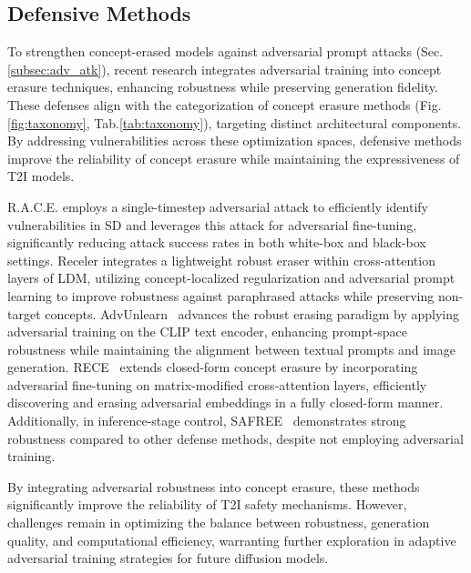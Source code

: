 \subsection{Defensive Methods}
To strengthen concept-erased models against adversarial prompt attacks (Sec.\ref{subsec:adv_atk}), recent research integrates adversarial training into concept erasure techniques, enhancing robustness while preserving generation fidelity. These defenses align with the categorization of concept erasure methods (Fig.\ref{fig:taxonomy}, Tab.\ref{tab:taxonomy}), targeting distinct architectural components. 
By addressing vulnerabilities across these optimization spaces, defensive methods improve the reliability of concept erasure while maintaining the expressiveness of T2I models.


R.A.C.E.\cite{RACE} employs a single-timestep adversarial attack to efficiently identify vulnerabilities in SD and leverages this attack for adversarial fine-tuning, significantly reducing attack success rates in both white-box and black-box settings. Receler\cite{Huang2023RecelerRC} integrates a lightweight robust eraser within cross-attention layers of LDM, utilizing concept-localized regularization and adversarial prompt learning to improve robustness against paraphrased attacks while preserving non-target concepts. AdvUnlearn~\cite{Zhang2024DefensiveUW} advances the robust erasing paradigm by applying adversarial training on the CLIP text encoder, enhancing prompt-space robustness while maintaining the alignment between textual prompts and image generation. RECE~\cite{Gong2024ReliableAE} extends closed-form concept erasure by incorporating adversarial fine-tuning on matrix-modified cross-attention layers, efficiently discovering and erasing adversarial embeddings in a fully closed-form manner. Additionally, in inference-stage control, SAFREE~\cite{safree} demonstrates strong robustness compared to other defense methods, despite not employing adversarial training.

By integrating adversarial robustness into concept erasure, these methods significantly improve the reliability of T2I safety mechanisms. However, challenges remain in optimizing the balance between robustness, generation quality, and computational efficiency, warranting further exploration in adaptive adversarial training strategies for future diffusion models.

